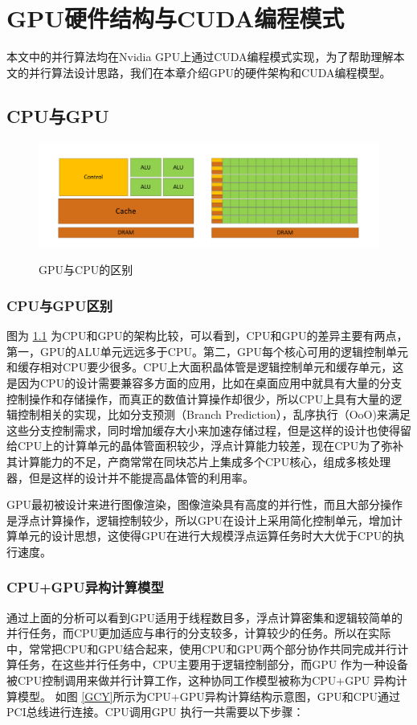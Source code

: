 \chapter{GPU硬件结构与CUDA编程模式}
本文中的并行算法均在Nvidia GPU上通过CUDA编程模式实现，为了帮助理解本文的并行算法设计思路，我们在本章介绍GPU的硬件架构和CUDA编程模型。
\section{CPU与GPU}
\begin{figure}
\setlength{\belowcaptionskip}{-0.5cm}
\begin{center}
{\includegraphics[width=1 \textwidth]{figures/GPU&CPU.pdf}}
\end{center}
\caption{{\footnotesize{GPU与CPU的区别}}}
\label{GCD}
\end{figure}
\subsection{CPU与GPU区别}

图为 \ref{GCD} 为CPU和GPU的架构比较，可以看到，CPU和GPU的差异主要有两点，第一，GPU的ALU单元远远多于CPU。第二，GPU每个核心可用的逻辑控制单元和缓存相对CPU要少很多。CPU上大面积晶体管是逻辑控制单元和缓存单元，这是因为CPU的设计需要兼容多方面的应用，比如在桌面应用中就具有大量的分支控制操作和存储操作，而真正的数值计算操作却很少，所以CPU上具有大量的逻辑控制相关的实现，比如分支预测（Branch Prediction），乱序执行（OoO)来满足这些分支控制需求，同时增加缓存大小来加速存储过程，但是这样的设计也使得留给CPU上的计算单元的晶体管面积较少，浮点计算能力较差，现在CPU为了弥补其计算能力的不足，产商常常在同块芯片上集成多个CPU核心，组成多核处理器，但是这样的设计并不能提高晶体管的利用率。

GPU最初被设计来进行图像渲染，图像渲染具有高度的并行性，而且大部分操作是浮点计算操作，逻辑控制较少，所以GPU在设计上采用简化控制单元，增加计算单元的设计思想，这使得GPU在进行大规模浮点运算任务时大大优于CPU的执行速度。
\subsection{CPU+GPU异构计算模型}
通过上面的分析可以看到GPU适用于线程数目多，浮点计算密集和逻辑较简单的并行任务，而CPU更加适应与串行的分支较多，计算较少的任务。所以在实际中，常常把CPU和GPU结合起来，使用CPU和GPU两个部分协作共同完成并行计算任务，在这些并行任务中，CPU主要用于逻辑控制部分，而GPU 作为一种设备被CPU控制调用来做并行计算工作，这种协同工作模型被称为CPU+GPU 异构计算模型。
如图 \ref{GCY}所示为CPU+GPU异构计算结构示意图，GPU和CPU通过PCI总线进行连接。CPU调用GPU 执行一共需要以下步骤：

